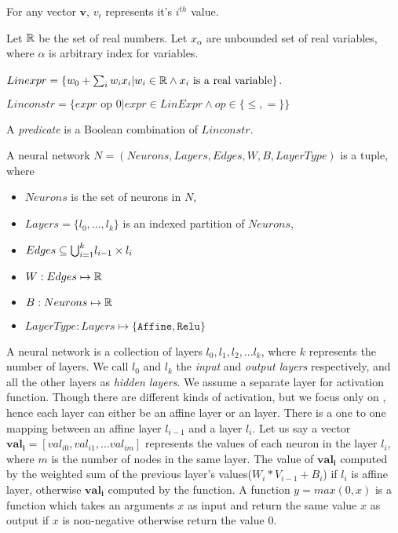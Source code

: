 For any vector $\boldsymbol{v}$, $v_i$ represents it's $i^{th}$ value.  

Let $\mathbb{R}$ be the set of real numbers.
Let $x_{\alpha}$ are unbounded set of real variables, where
$\alpha$ is arbitrary index for variables.

\begin{df}
    $Linexpr = \{ w_0 + \sum_{i} w_i x_i | w_i \in \mathbb{R} \land x_i \text{ is a real variable} \}$.
\end{df}
  
\begin{df}
    $Linconstr = \{expr \text{ op } 0 | expr \in LinExpr \land op \in \{\leq, = \}\}$
\end{df}

A {\em predicate} is a Boolean combination of $Linconstr$.

\begin{df}
    A neural network $N = (Neurons, Layers, Edges, W, B, LayerType)$ is a tuple, where
    \begin{itemize}
        \item $Neurons$ is the set of neurons in $N$,
        \item $Layers = \{l_0,...,l_k\}$ is an indexed partition of $Neurons$,
        \item $ Edges \subseteq {\bigcup}_{i=1}^{k} l_{i-1} \times l_{i}$
        \item $W : Edges \mapsto \mathbb{R}$
        \item $B : Neurons \mapsto \mathbb{R}$
        \item $LayerType : Layers \mapsto \{\mathtt{Affine}, \mathtt{Relu}\}$
    \end{itemize}
\end{df}

A neural network is a collection of layers $l_0, l_1, l_2, ... l_k$, where $k$ represents the number of layers.
We call $l_0$ and $l_k$ the {\em input} and {\em output layers} respectively, and all the other layers 
as {\em hidden layers}. We assume a separate layer for activation function. Though there are different kinds of
activation, but we focus only on \relu{}, hence each layer can either be an affine layer or an \relu{} layer.
There is a one to one mapping between an affine layer $l_{i-1}$ and a \relu{} layer $l_i$. 
Let us say a vector $\boldsymbol{val_i} = [val_{i0}, val_{i1}, ... val_{im}]$ represents the values of each neuron 
in the layer $l_i$, where $m$ is the number of nodes in the same layer.
The value of $\boldsymbol{val_i}$ computed by the weighted sum of the previous layer's values($W_i * V_{i-1} + B_i$)
if $l_i$ is affine layer, otherwise $\boldsymbol{val_i}$ computed by the \relu{} function. 
A function $y = max(0,x)$ is a \relu{} function which takes an arguments $x$ as input and return the
same value $x$ as output if $x$ is non-negative otherwise return the value 0. 

